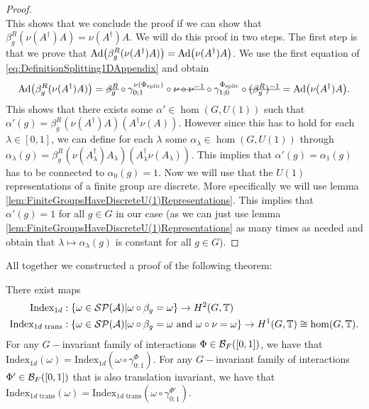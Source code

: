\documentclass[11pt,a4paper,twoside]{article}
\numberwithin{equation}{section}
\begin{document}
\begin{proof}
\begin{equation}
		\end{equation}
		This shows that we conclude the proof if we can show that $\beta_g^R(\nu(A^\dagger)A)=\nu(A^\dagger)A$. We will do this proof in two steps. The first step is that we prove that $\Ad{\beta_g^R(\nu(A^\dagger)A)}=\Ad{\nu(A^\dagger)A}$. We use the first equation of \eqref{eq:DefinitionSplitting1DAppendix} and obtain
		\begin{align}
			\Ad{\beta_g^R(\nu(A^\dagger)A)}=\stkout{\beta_g^R}\circ\gamma^{\nu(\Phi_{\text{split}})}_{0;1}\circ\stkout{\nu\circ\nu^{-1}}\circ\gamma^{\Phi_{\text{split}}}_{1;0}\circ\stkout{(\beta_g^R)^{-1}}=\Ad{\nu(A^\dagger)A}.
		\end{align}
		This shows that there exists some $\alpha'\in\hom(G,U(1))$ such that $\alpha'(g)=\beta_g^R(\nu(A^\dagger)A)(A^\dagger \nu(A))$. However since this has to hold for each $\lambda\in[0,1]$, we can define for each $\lambda$ some $\alpha_\lambda\in\hom(G,U(1))$ through $\alpha_\lambda(g)=\beta_g^R(\nu(A^\dagger_\lambda)A_\lambda)(A^\dagger_\lambda \nu(A_\lambda))$. This implies that $\alpha'(g)=\alpha_1(g)$ has to be connected to $\alpha_0(g)=1$. Now we will use that the $U(1)$ representations of a finite group are discrete. More specifically we will use lemma \ref{lem:FiniteGroupsHaveDiscreteU(1)Representations}. This implies that $\alpha'(g)=1$ for all $g\in G$ in our case (as we can just use lemma \ref{lem:FiniteGroupsHaveDiscreteU(1)Representations} as many times as needed and obtain that $\lambda\mapsto\alpha_\lambda(g)$ is constant for all $g\in G$).
	\end{proof}
	All together we constructed a proof of the following theorem:
	\begin{theorem}
		There exist maps
		\begin{align}
			\textrm{Index}_{1d}&:\{\omega\in\mathcal{S}\mathcal P(\mathcal A)|\omega\circ\beta_g=\omega\}\rightarrow H^2(G,\mathbb T)\\
			\textrm{Index}_{1d\text{ trans}}&:\{\omega\in\mathcal{S}\mathcal P(\mathcal A)|\omega\circ\beta_g=\omega\text{ and }\omega\circ\nu=\omega\}\rightarrow H^1(G,\mathbb T)\cong \hom(G,\mathbb T).
		\end{align}
		For any $G-$invariant family of interactions $\Phi\in\mathcal B_{F}([0,1])$, we have that $\textrm{Index}_{1d}(\omega)=\textrm{Index}_{1d}(\omega\circ\gamma^\Phi_{0;1})$. For any $G-$invariant family of interactions $\Phi'\in\mathcal B_{F}([0,1])$ that is also translation invariant, we have that $\textrm{Index}_{1d\text{ trans}}(\omega)=\textrm{Index}_{1d\text{ trans}}(\omega\circ\gamma^{\Phi'}_{0;1})$.
	\end{theorem}
\end{document}
